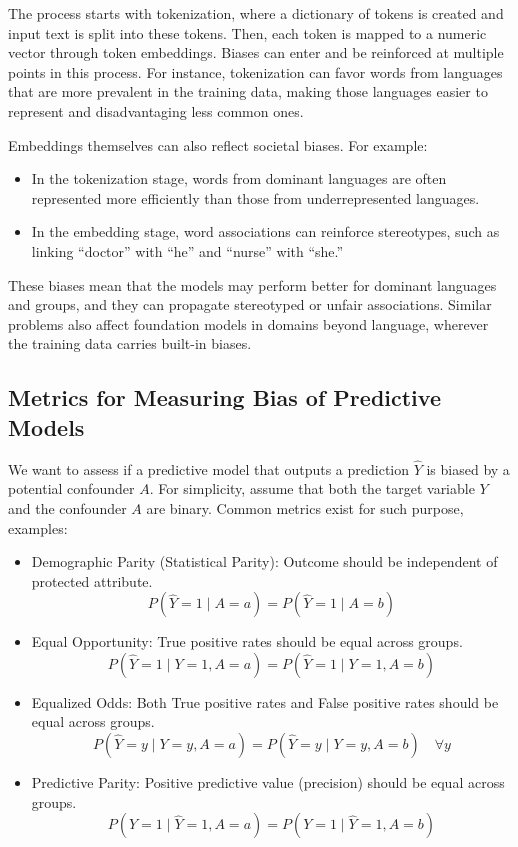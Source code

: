 \documentclass{article}
\begin{document}
The process starts with tokenization, where a dictionary of tokens is created and input text is split into these tokens. Then, each token is mapped to a numeric vector through token embeddings. Biases can enter and be reinforced at multiple points in this process. For instance, tokenization can favor words from languages that are more prevalent in the training data, making those languages easier to represent and disadvantaging less common ones.

Embeddings themselves can also reflect societal biases. For example:
\begin{itemize}
    \item In the tokenization stage, words from dominant languages are often represented more efficiently than those from underrepresented languages.
    \item In the embedding stage, word associations can reinforce stereotypes, such as linking “doctor” with “he” and “nurse” with “she.”
\end{itemize}

These biases mean that the models may perform better for dominant languages and groups, and they can propagate stereotyped or unfair associations. Similar problems also affect foundation models in domains beyond language, wherever the training data carries built-in biases.

\subsection*{Metrics for Measuring Bias of Predictive Models}
We want to assess if a predictive model that outputs a prediction $\hat{Y}$ is biased by a potential confounder $A$. For simplicity, assume that both the target variable $Y$ and the confounder $A$ are binary. Common metrics exist for such purpose, examples:
\begin{itemize}
    \item Demographic Parity (Statistical Parity): Outcome should be independent of protected attribute.
    \[
    P(\hat{Y}=1 \mid A=a) = P(\hat{Y}=1 \mid A=b)
    \] 
    \item Equal Opportunity: True positive rates should be equal across groups.
    \[
    P(\hat{Y}=1 \mid Y=1, A=a) = P(\hat{Y}=1 \mid Y=1, A=b)
    \]
    \item Equalized Odds: Both True positive rates and False positive rates should be equal across groups.
    \[
    P(\hat{Y}=y \mid Y=y, A=a) = P(\hat{Y}=y \mid Y=y, A=b) \quad \forall y
    \]
    \item Predictive Parity: Positive predictive value (precision) should be equal across groups.
    \[
    P(Y=1 \mid \hat{Y}=1, A=a) = P(Y=1 \mid \hat{Y}=1, A=b)
    \]
\end{itemize}
\end{document}
